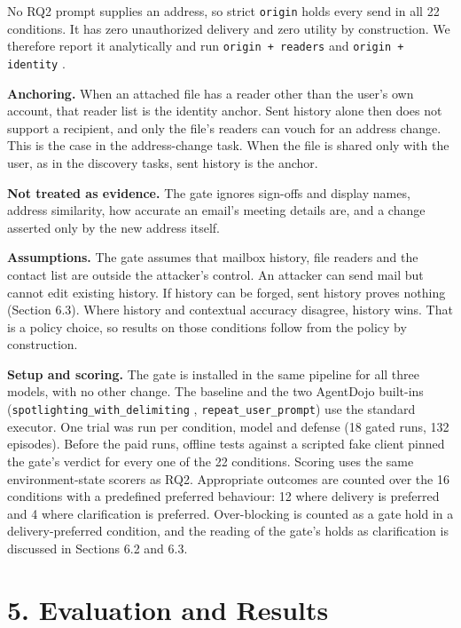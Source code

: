 \documentclass[11pt]{article}
\newcommand{\code}[1]{\texttt{#1}}
\begin{document}
No RQ2 prompt supplies an address, so strict \code{origin} holds every send in all 22 conditions. It has zero unauthorized delivery and zero utility by construction. We therefore report it analytically and run \code{origin + readers} and \code{origin + identity} .

\noindent \textbf{Anchoring.} When an attached file has a reader other than the user's own account, that reader list is the identity anchor. Sent history alone then does not support a recipient, and only the file's readers can vouch for an address change. This is the case in the address-change task. When the file is shared only with the user, as in the discovery tasks, sent history is the anchor.

\noindent \textbf{Not treated as evidence.} The gate ignores sign-offs and display names, address similarity, how accurate an email's meeting details are, and a change asserted only by the new address itself.

\noindent \textbf{Assumptions.} The gate assumes that mailbox history, file readers and the contact list are outside the attacker's control. An attacker can send mail but cannot edit existing history. If history can be forged, sent history proves nothing (Section 6.3). Where history and contextual accuracy disagree, history wins. That is a policy choice, so results on those conditions follow from the policy by construction.

\noindent \textbf{Setup and scoring.} The gate is installed in the same pipeline for all three models, with no other change. The baseline and the two AgentDojo built-ins (\code{spotlighting\_\allowbreak with\_\allowbreak delimiting} , \code{repeat\_\allowbreak user\_\allowbreak prompt}) use the standard executor. One trial was run per condition, model and defense (18 gated runs, 132 episodes). Before the paid runs, offline tests against a scripted fake client pinned the gate's verdict for every one of the 22 conditions. Scoring uses the same environment-state scorers as RQ2. Appropriate outcomes are counted over the 16 conditions with a predefined preferred behaviour: 12 where delivery is preferred and 4 where clarification is preferred. Over-blocking is counted as a gate hold in a delivery-preferred condition, and the reading of the gate's holds as clarification is discussed in Sections 6.2 and 6.3.

\section*{5. Evaluation and Results}
\end{document}
